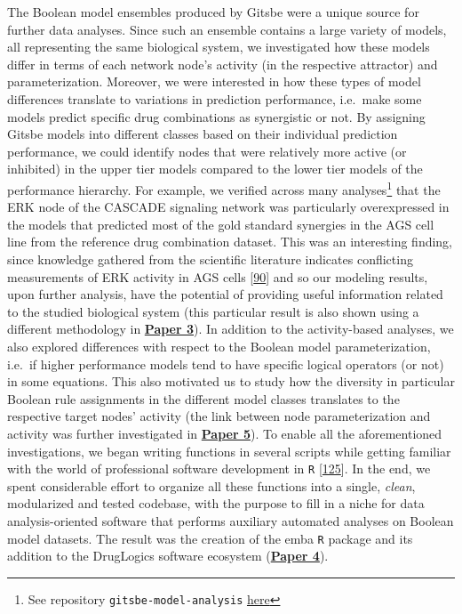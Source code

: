 \documentclass[
  12pt,
]{book}
\begin{document}
The Boolean model ensembles produced by Gitsbe were a unique source for further data analyses.
Since such an ensemble contains a large variety of models, all representing the same biological system, we investigated how these models differ in terms of each network node's activity (in the respective attractor) and parameterization.
Moreover, we were interested in how these types of model differences translate to variations in prediction performance, i.e.~make some models predict specific drug combinations as synergistic or not.
By assigning Gitsbe models into different classes based on their individual prediction performance, we could identify nodes that were relatively more active (or inhibited) in the upper tier models compared to the lower tier models of the performance hierarchy.
For example, we verified across many analyses\footnote{See repository \texttt{gitsbe-model-analysis} \protect\hyperlink{misc-links}{here}} that the ERK node of the CASCADE signaling network was particularly overexpressed in the models that predicted most of the gold standard synergies in the AGS cell line from the reference drug combination dataset.
This was an interesting finding, since knowledge gathered from the scientific literature indicates conflicting measurements of ERK activity in AGS cells {[}\protect\hyperlink{ref-Flobak2015}{90}{]} and so our modeling results, upon further analysis, have the potential of providing useful information related to the studied biological system (this particular result is also shown using a different methodology in \textbf{\protect\hyperlink{Paper3}{Paper 3}}).
In addition to the activity-based analyses, we also explored differences with respect to the Boolean model parameterization, i.e.~if higher performance models tend to have specific logical operators (or not) in some equations.
This also motivated us to study how the diversity in particular Boolean rule assignments in the different model classes translates to the respective target nodes' activity (the link between node parameterization and activity was further investigated in \textbf{\protect\hyperlink{Paper5}{Paper 5}}).
To enable all the aforementioned investigations, we began writing functions in several scripts while getting familiar with the world of professional software development in \texttt{R} {[}\protect\hyperlink{ref-Wickham2015}{125}{]}.
In the end, we spent considerable effort to organize all these functions into a single, \emph{clean}, modularized and tested codebase, with the purpose to fill in a niche for data analysis-oriented software that performs auxiliary automated analyses on Boolean model datasets.
The result was the creation of the emba \texttt{R} package and its addition to the DrugLogics software ecosystem (\textbf{\protect\hyperlink{Paper4}{Paper 4}}).
\end{document}
